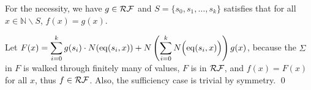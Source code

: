 
\begin{pf} \rm
 For the necessity, we have $g\in\mathcal{RF}$ and
 $S=\{s_0,s_1,\ldots,s_k\}$ satisfies that
 for all $x\in\mathbb{N}\mathop{\backslash} S$, $f(x) = g(x)$.
 
 Let $\displaystyle F(x) = \sum_{i=0}^{k} g(s_i)\cdot N(\mathrm{eq}(s_i, x))
 + N\left( \sum_{i=0}^{k} N\Big(\mathrm{eq}(s_i, x)\Big) \right) g(x)$,
 because the $\Sigma$ in $F$ is walked through finitely many of values,
 $F$ is in $\mathcal{RF}$, and $f(x)=F(x)$ for all $x$, thus $f\in\mathcal{RF}$.
 Also, the sufficiency case is trivial by symmetry. \qed
\end{pf}
